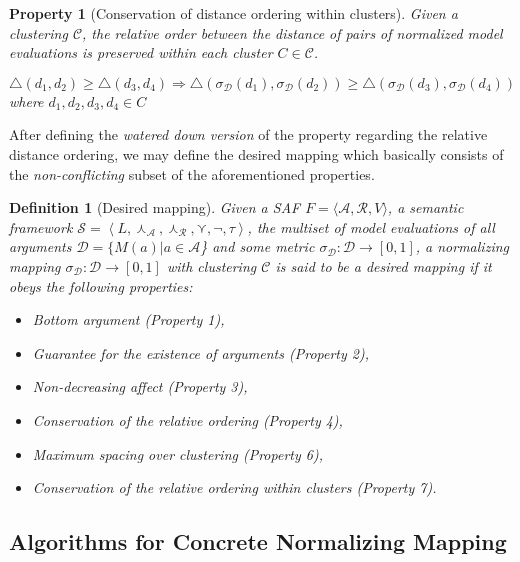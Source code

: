 \documentclass{article}
\newtheorem{definition}{Definition}
\newtheorem{property}{Property}
\newcommand{\args}{\mathcal{A}} %
\newcommand{\att}{\mathcal{R}}  %
\newcommand{\valueset}{L}
\newcommand{\safid}{F}               %
\newcommand{\saf}{\safid = \safbody} %
\newcommand{\safbody}{\langle \args, \att, V \rangle} %
\newcommand{\sembodyNew}{\left\langle \valueset,\SAFand_\mathcal{A}, \SAFand_\mathcal{R},\SAFor,\lnot,\tau \right\rangle} %
\newcommand{\SAFand}{\curlywedge}     %
\newcommand{\SAFor}{\curlyvee}        %
\newcommand{\sem}{\mathcal{S}}
\newcommand{\dataset}{\mathcal{D}}   %
\newcommand{\clusterset}{\mathcal{C}}   %
\begin{document}
\begin{property} [Conservation of distance ordering within clusters] Given a clustering $\clusterset$, the relative order between the distance of pairs of normalized model evaluations is preserved within each cluster $C \in \clusterset$. 
\label{prop:ConDisClus}
\begin{center}
 $\bigtriangleup(d_1, d_2) \geq \bigtriangleup(d_3, d_4) \Longrightarrow 
\bigtriangleup(\sigma_{\dataset}(d_1), \sigma_{\dataset}(d_2)) \geq \bigtriangleup(\sigma_{\dataset}(d_3), \sigma_{\dataset}(d_4))$\\
where $d_1, d_2, d_3, d_4 \in C$
\end{center}
\end{property}

After defining the \emph{watered down version} of the property regarding the relative distance ordering, we may define the desired mapping which basically consists of the \emph{non-conflicting} subset of the aforementioned properties.

\begin{definition} [Desired mapping] 
Given a SAF $\saf$, a semantic framework $\sem = \sembodyNew$, the multiset of model evaluations of all arguments $\dataset = \{M(a)|a \in \args$\} and some metric $\sigma_{\dataset}: \dataset  \rightarrow  [0,1]$, a normalizing mapping $\sigma_{\dataset}: \dataset  \rightarrow  [0,1]$ with clustering $\clusterset$ is said to be a desired mapping if it obeys the following properties:
\begin{itemize}
\item Bottom argument (Property 1),
\item Guarantee for the existence of arguments (Property 2),
\item Non-decreasing affect (Property 3),
\item Conservation of the relative ordering (Property 4),
\item Maximum spacing over clustering (Property 6),
\item Conservation of the relative ordering within clusters (Property 7).
\end{itemize}
\end{definition}


\subsection{Algorithms for Concrete Normalizing Mapping}
\end{document}
